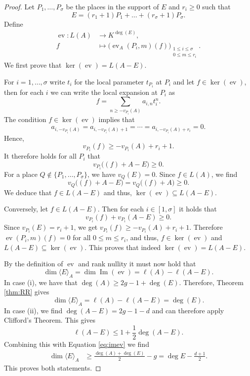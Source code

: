 \documentclass[12pt]{amsart}
\renewcommand{\leq}{\leqslant}
\renewcommand{\geq}{\geqslant}
\DeclareMathOperator{\ev}{ev}
\theoremstyle{definition}
\newcommand{\divi}[1]{\langle #1 \rangle}
\begin{document}
	
	\begin{proof}
		Let $P_1, \ldots, P_\sigma$ be the places in the support of $E$ and $r_i \geq 0$ such that $$E = (r_1 + 1) P_1 + \ldots + (r_\sigma + 1) P_\sigma.$$ Define
		\begin{align*}
			\ev : L(A)&\to K^{\deg(E)},\\
			f&\mapsto \big(\ev_A(P_i,m)(f)\big)_{\substack{ 1 \leq i \leq \sigma \\ 0 \leq m \leq r_i}}.
		\end{align*}
		We first prove that $\ker(\ev)=L(A-E)$. 
		
		For $i = 1, \ldots, \sigma$ write $t_i$ for the local parameter $t_{P_i}$ at $P_i$ and let
		$f\in \ker(\ev)$, then for each $i$ we can write the local expansion at $P_i$ as
		$$f=\sum_{n\ge -v_{P_i}(A)} a_{i,n}t_i^n.$$
		The condition $f\in \ker(\ev)$ implies that
		$$a_{i,-v_{P_i}(A)}=a_{i,-v_{P_i}(A)+1}=\cdots=a_{i,-v_{P_i}(A)+r_i}=0.$$
		Hence,
		$$ v_{P_i}(f)\ge -v_{P_i}(A)+r_i+1. $$
		It therefore holds for all $P_i$ that
		$$v_{P_i}\big((f)+A-E\big)\ge 0.$$
		For a place $Q\notin\{P_1,\ldots,P_\sigma\}$, we have
		$v_Q(E)=0$. Since $f\in L(A)$, we find
		$$v_Q\big((f)+A-E\big)= v_Q\big((f)+A\big)\ge 0.$$
		We deduce that $f\in L(A-E)$ and thus, $\ker(\ev) \subseteq L(A-E)$.
		
		Conversely, let $f\in L(A-E)$. Then for each $i \in [1, \sigma]$ it holds that
		$$v_{P_i}(f)+v_{P_i}(A-E)\ge 0.$$
		Since $v_{P_i}(E)=r_i+1$, we get $v_{P_i}(f)\ge -v_{P_i}(A)+r_i+1$.
		Therefore $\ev(P_i,m)(f)=0$ for all $0\le m\le r_i$, and thus, $f\in\ker(\ev)$ and $L(A-E) \subseteq \ker(\ev).$ This proves that indeed $\ker(\ev) = L(A-E)$. 
		
		By the definition of $\ev$ and rank nullity it must now hold that 
		\begin{equation}\label{eq:imev} 
			\dim \divi E_A = \dim \operatorname{Im}(\ev) = \ell(A) - \ell(A-E).
		\end{equation}
		In case (i), we have that $\deg(A)\ge 2g-1+\deg(E)$. Therefore, Theorem \ref{thm:RR} gives
		$$\dim \divi {E}_A = \ell (A)-\ell (A-E)=\deg(E).$$
		In case (ii), we find $\deg(A-E) = 2g-1-d$ and can therefore apply Clifford's Theorem. This gives
		$$ \ell(A-E ) \le 1+\frac{1}{2}{\deg (A-E)}.$$
		Combining this with Equation \eqref{eq:imev} we find
		\begin{align*}
			\dim \divi{E}_A &\ge \frac{\deg(A) + \deg(E)}2 - g =\deg E- \frac{d+1}{2}. 
		\end{align*}
		This proves both statements. 
	\end{proof}
\end{document}
